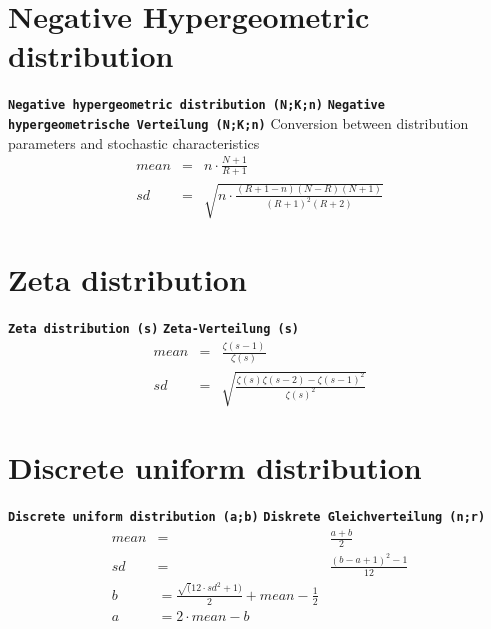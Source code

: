 \documentclass{svmono}
\def\cm#1{\textbf{\texttt{#1}}}
\begin{document}
\section*{Negative Hypergeometric distribution}
\cm{Negative hypergeometric distribution (N;K;n)}
\cm{Negative hypergeometrische Verteilung (N;K;n)}
Conversion between distribution parameters and stochastic characteristics
\begin{eqnarray*}
mean&=&n\cdot\frac{N+1}{R+1}\\
sd&=&\sqrt{n\cdot\frac{(R+1-n)(N-R)(N+1)}{(R+1)^2(R+2)}}
\end{eqnarray*}





\section*{Zeta distribution}
\cm{Zeta distribution (s)}
\cm{Zeta-Verteilung (s)}
\begin{eqnarray*}
mean&=&\frac{\zeta(s-1)}{\zeta(s)}\\
sd&=&\sqrt{\frac{\zeta(s)\zeta(s-2)-\zeta(s-1)^2}{\zeta(s)^2}}
\end{eqnarray*}





\section*{Discrete uniform distribution}
\cm{Discrete uniform distribution (a;b)}
\cm{Diskrete Gleichverteilung (n;r)}
\begin{eqnarray*}
mean&=&\frac{a+b}{2}\\
sd&=&\frac{(b-a+1)^2-1}{12}\\
b&=\frac{\sqrt(12\cdot sd^2+1)}{2}+mean-\frac{1}{2}\\
a&=2\cdot mean-b&
\end{eqnarray*}
\end{document}
